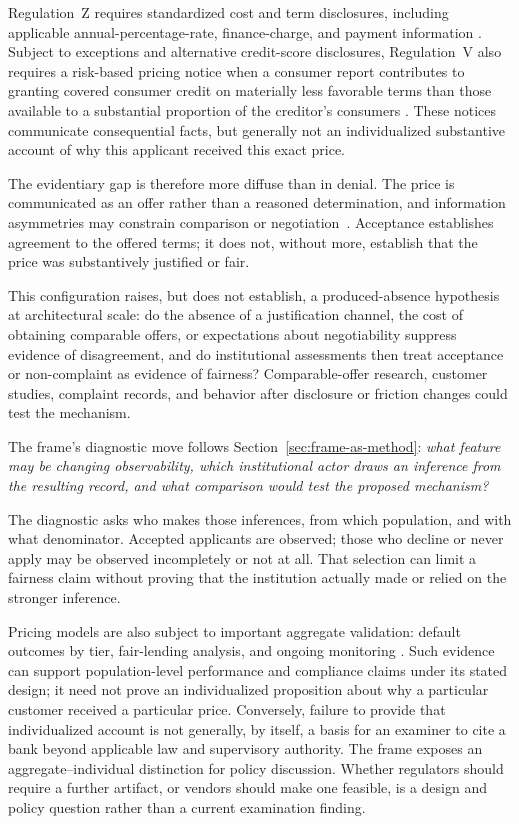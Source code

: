 Regulation~Z requires standardized cost and term disclosures, including applicable annual-percentage-rate, finance-charge, and payment information \parencite{regZ1026}. Subject to exceptions and alternative credit-score disclosures, Regulation~V also requires a risk-based pricing notice when a consumer report contributes to granting covered consumer credit on materially less favorable terms than those available to a substantial proportion of the creditor's consumers \parencite{regV1022_72}. These notices communicate consequential facts, but generally not an individualized substantive account of why this applicant received this exact price.

The evidentiary gap is therefore more diffuse than in denial. The price is communicated as an offer rather than a reasoned determination, and information asymmetries may constrain comparison or negotiation~\parencite{bartlett2022consumer}. Acceptance establishes agreement to the offered terms; it does not, without more, establish that the price was substantively justified or fair.

This configuration raises, but does not establish, a produced-absence hypothesis at architectural scale: do the absence of a justification channel, the cost of obtaining comparable offers, or expectations about negotiability suppress evidence of disagreement, and do institutional assessments then treat acceptance or non-complaint as evidence of fairness? Comparable-offer research, customer studies, complaint records, and behavior after disclosure or friction changes could test the mechanism.

The frame's diagnostic move follows Section~\ref{sec:frame-as-method}: \emph{what feature may be changing observability, which institutional actor draws an inference from the resulting record, and what comparison would test the proposed mechanism?}

The diagnostic asks who makes those inferences, from which population, and with what denominator. Accepted applicants are observed; those who decline or never apply may be observed incompletely or not at all. That selection can limit a fairness claim without proving that the institution actually made or relied on the stronger inference.

Pricing models are also subject to important aggregate validation: default outcomes by tier, fair-lending analysis, and ongoing monitoring \parencite{sr11_7,sr26_2}. Such evidence can support population-level performance and compliance claims under its stated design; it need not prove an individualized proposition about why a particular customer received a particular price. Conversely, failure to provide that individualized account is not generally, by itself, a basis for an examiner to cite a bank beyond applicable law and supervisory authority. The frame exposes an aggregate--individual distinction for policy discussion. Whether regulators should require a further artifact, or vendors should make one feasible, is a design and policy question rather than a current examination finding.

